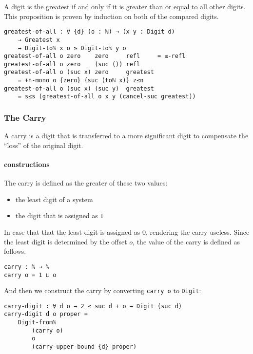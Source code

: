 \documentclass[../thesis.tex]{subfiles}
\begin{document}
A digit is the greatest if and only if it is greater than or equal to all other
digits. This proposition is proven by induction on both of the compared digits.

\begin{lstlisting}
greatest-of-all : ∀ {d} (o : ℕ) → (x y : Digit d)
    → Greatest x
    → Digit-toℕ x o ≥ Digit-toℕ y o
greatest-of-all o zero    zero     refl     = ≤-refl
greatest-of-all o zero    (suc ()) refl
greatest-of-all o (suc x) zero     greatest
    = +n-mono o {zero} {suc (toℕ x)} z≤n
greatest-of-all o (suc x) (suc y)  greatest
    = s≤s (greatest-of-all o x y (cancel-suc greatest))
\end{lstlisting}

\subsubsection{The Carry}

A carry is a digit that is transferred to a more significant digit to compensate
the ``loss'' of the original digit.

\paragraph{constructions}

The carry is defined as the greater of these two values:

\begin{itemize}
    \item the least digit of a system
    \item the digit that is assigned as $ 1 $
\end{itemize}

In case that that the least digit is assigned as $ 0 $, rendering the carry useless.
Since the least digit is determined by the offset $ o $, the value of the carry
is defined as follows.

\begin{lstlisting}
carry : ℕ → ℕ
carry o = 1 ⊔ o
\end{lstlisting}

And then we construct the carry by converting {\lstinline|carry o|} to {\lstinline|Digit|}:

\begin{lstlisting}
carry-digit : ∀ d o → 2 ≤ suc d + o → Digit (suc d)
carry-digit d o proper =
    Digit-fromℕ
        (carry o)
        o
        (carry-upper-bound {d} proper)
\end{lstlisting}
\end{document}
